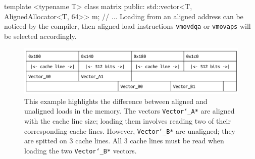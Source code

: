 \documentclass[logo,bsc,singlespacing,parskip]{infthesis}
\newenvironment{VerbatimCompact}
  {\vspace*{-2.5mm}\VerbatimEnvironment
   \par\Verbatim}
  {\endVerbatim\vspace*{-2.4mm}}
\begin{document}
\begin{VerbatimCompact}
template <typename T>
class matrix {
public:
  std::vector<T, AlignedAllocator<T, 64>> m;
  // ...
}
\end{VerbatimCompact}
Loading from an aligned address can be noticed by the compiler, then aligned load instructions \texttt{vmovdqa} or \texttt{vmovaps} will be selected accordingly. 

\begin{figure} [H]
    \begin{center}
        \includegraphics[width=\linewidth]{image/cacheline.png}
    \end{center}
    \caption{This example highlights the difference between aligned and unaligned loads in the memory. The vectors \texttt{Vector\char`_A*} are aligned with the cache line size; loading them involves reading two of their corresponding cache lines. However, \texttt{Vector\char`_B*} are unaligned; they are spitted on 3 cache lines. All 3 cache lines must be read when loading the two \texttt{Vector\char`_B*} vectors. }
    \label{fig:cacheline}
\end{figure}




\end{document}
